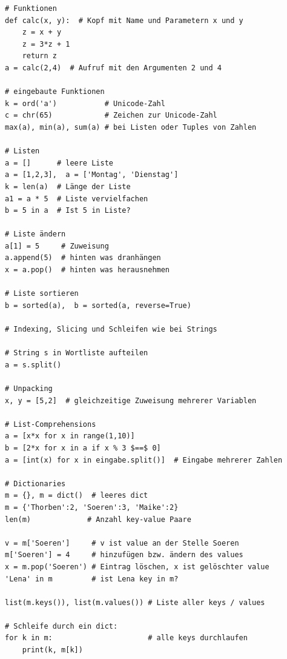 \documentclass[a4paper,11pt,landscape,twocolumn]{book}
\begin{document}
\newpage
\begin{lstlisting}
# Funktionen
def calc(x, y):  # Kopf mit Name und Parametern x und y
    z = x + y         
    z = 3*z + 1
    return z
a = calc(2,4)  # Aufruf mit den Argumenten 2 und 4
        
# eingebaute Funktionen
k = ord('a')           # Unicode-Zahl 
c = chr(65)            # Zeichen zur Unicode-Zahl
max(a), min(a), sum(a) # bei Listen oder Tuples von Zahlen

# Listen
a = []      # leere Liste
a = [1,2,3],  a = ['Montag', 'Dienstag'] 
k = len(a)  # Länge der Liste
a1 = a * 5  # Liste vervielfachen
b = 5 in a  # Ist 5 in Liste?

# Liste ändern
a[1] = 5     # Zuweisung
a.append(5)  # hinten was dranhängen
x = a.pop()  # hinten was herausnehmen

# Liste sortieren
b = sorted(a),  b = sorted(a, reverse=True)

# Indexing, Slicing und Schleifen wie bei Strings

# String s in Wortliste aufteilen
a = s.split()

# Unpacking
x, y = [5,2]  # gleichzeitige Zuweisung mehrerer Variablen

# List-Comprehensions
a = [x*x for x in range(1,10)]
b = [2*x for x in a if x % 3 $==$ 0]
a = [int(x) for x in eingabe.split()]  # Eingabe mehrerer Zahlen

# Dictionaries
m = {}, m = dict()  # leeres dict
m = {'Thorben':2, 'Soeren':3, 'Maike':2}
len(m)             # Anzahl key-value Paare

v = m['Soeren']     # v ist value an der Stelle Soeren  
m['Soeren'] = 4     # hinzufügen bzw. ändern des values
x = m.pop('Soeren') # Eintrag löschen, x ist gelöschter value
'Lena' in m         # ist Lena key in m?

list(m.keys()), list(m.values()) # Liste aller keys / values 

# Schleife durch ein dict:
for k in m:                      # alle keys durchlaufen     
    print(k, m[k]) 

\end{lstlisting}
\end{document}
